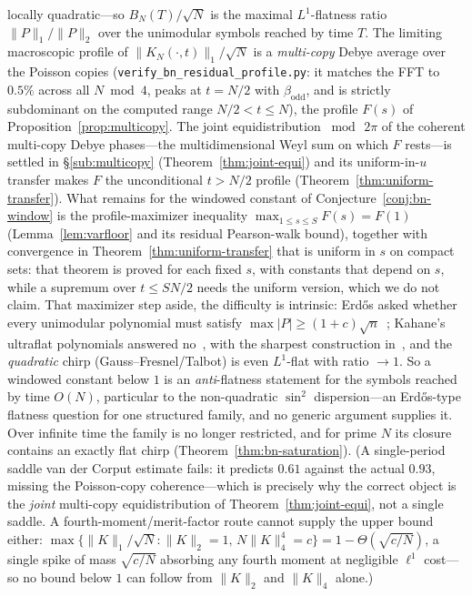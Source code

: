 \begin{remark}
locally quadratic---so $B_N(T)/\sqrt N$ is the maximal $L^1$-flatness ratio $\|P\|_1/\|P\|_2$ over the
unimodular symbols reached by time $T$. The limiting macroscopic profile of $\|K_N(\cdot,t)\|_1/\sqrt N$ is a
\emph{multi-copy} Debye average over the Poisson copies (\texttt{verify\_bn\_residual\_profile.py}: it
matches the FFT to $0.5\%$ across all $N\bmod4$, peaks at $t=N/2$ with $\beta_{\mathrm{odd}}$, and is
strictly subdominant on the computed range $N/2<t\le N$), the profile $F(s)$ of
Proposition~\ref{prop:multicopy}. The joint equidistribution $\bmod\,2\pi$ of the coherent multi-copy Debye
phases---the multidimensional Weyl sum on which $F$ rests---is settled in \S\ref{sub:multicopy}
(Theorem~\ref{thm:joint-equi}) and its uniform-in-$u$ transfer makes $F$ the unconditional $t>N/2$ profile
(Theorem~\ref{thm:uniform-transfer}). What remains for the windowed constant of Conjecture~\ref{conj:bn-window}
is the profile-maximizer inequality $\max_{1\le s\le S}F(s)=F(1)$ (Lemma~\ref{lem:varfloor} and its residual
Pearson-walk bound), together with convergence in Theorem~\ref{thm:uniform-transfer} that is uniform in $s$ on
compact sets: that theorem is proved for each fixed $s$, with constants that depend on $s$, while a supremum over
$t\le SN/2$ needs the uniform version, which we do not claim. That maximizer step aside, the difficulty is
intrinsic: Erd\H{o}s asked whether every unimodular polynomial must satisfy
$\max|P|\ge(1+c)\sqrt{n}$~\cite{Erdos57}; Kahane's ultraflat polynomials answered no~\cite{Kahane80}, with
the sharpest construction in~\cite{BombieriBourgain}, and the \emph{quadratic} chirp
(Gauss--Fresnel/Talbot) is even $L^1$-flat with ratio $\to1$. So a windowed constant below $1$ is an
\emph{anti}-flatness statement for the symbols reached by time $O(N)$, particular to the non-quadratic $\sin^2$
dispersion---an Erd\H{o}s-type flatness question for one structured family, and no generic argument supplies
it. Over infinite time the family is no longer restricted, and for prime $N$ its closure contains an exactly
flat chirp (Theorem~\ref{thm:bn-saturation}).
(A single-period
saddle van der Corput estimate fails: it predicts $0.61$ against the actual $0.93$, missing the Poisson-copy
coherence---which is precisely why the correct object is the \emph{joint} multi-copy equidistribution of
Theorem~\ref{thm:joint-equi}, not a single saddle. A fourth-moment/merit-factor route cannot supply the upper bound either:
$\max\{\|K\|_1/\sqrt N:\|K\|_2=1,\,N\|K\|_4^4=c\}=1-\Theta(\sqrt{c/N})$, a single spike of mass
$\sqrt{c/N}$ absorbing any fourth moment at negligible $\ell^1$ cost---so no bound below $1$ can follow
from $\|K\|_2$ and $\|K\|_4$ alone.)
\end{remark}

